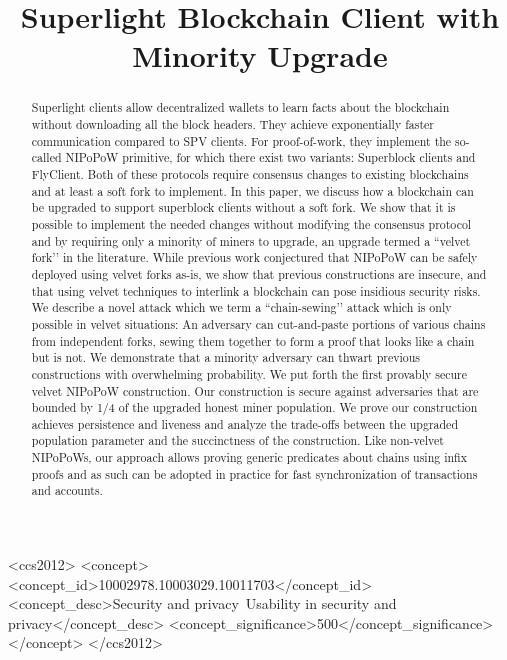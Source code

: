 \documentclass[sigconf, anonymous]{acmart}
\theoremstyle{plain}
\theoremstyle{definition}
\begin{document}
\title{Superlight Blockchain Client with Minority Upgrade} %

\begin{abstract}
Superlight clients allow decentralized wallets to learn facts about the blockchain without downloading all the block headers. They achieve exponentially faster communication compared to SPV clients. For proof-of-work, they implement the so-called NIPoPoW primitive, for which there exist two variants: Superblock clients and FlyClient. Both of these protocols require consensus changes to existing blockchains and at least a soft fork to implement. In this paper, we discuss how a blockchain can be upgraded to support superblock clients without a soft fork. We show that it is possible to implement the needed changes without modifying the consensus protocol and by requiring only a minority of miners to upgrade, an upgrade termed a ``velvet fork’' in the literature. While previous work conjectured that NIPoPoW can be safely deployed using velvet forks as-is, we show that previous constructions are insecure, and that using velvet techniques to interlink a blockchain can pose insidious security risks. We describe a novel attack which we term a ``chain-sewing’' attack which is only possible in velvet situations: An adversary can cut-and-paste portions of various chains from independent forks, sewing them together to form a proof that looks like a chain but is not. We demonstrate that a minority adversary can thwart previous constructions with overwhelming probability. We put forth the first provably secure velvet NIPoPoW construction. Our construction is secure against adversaries that are bounded by 1/4 of the upgraded honest miner population. We prove our construction achieves persistence and liveness and analyze the trade-offs between the upgraded population parameter and the succinctness of the construction. Like non-velvet NIPoPoWs, our approach allows proving generic predicates about chains using infix proofs and as such can be adopted in practice for fast synchronization of transactions and accounts.
\end{abstract}

\begin{CCSXML}
<ccs2012>
<concept>
<concept_id>10002978.10003029.10011703</concept_id>
<concept_desc>Security and privacy~Usability in security and privacy</concept_desc>
<concept_significance>500</concept_significance>
</concept>
</ccs2012>
\end{CCSXML}



\maketitle

 



\end{document}
